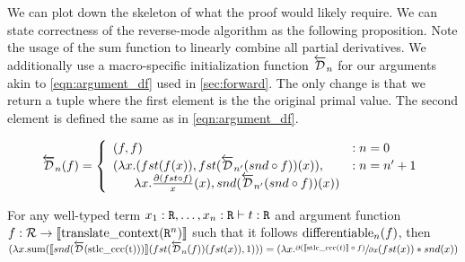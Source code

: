   We can plot down the skeleton of what the proof would likely require.
  We can state correctness of the reverse-mode algorithm as the following proposition.
  Note the usage of the $\text{sum}$ function to linearly combine all partial derivatives.
  We additionally use a macro-specific initialization function $\overleftarrow{\mathcal{D}}_n$ for our arguments akin to \cref{eqn:argument_df} used in \cref{sec:forward}.
  The only change is that we return a tuple where the first element is the the original primal value.
  The second element is defined the same as in \cref{eqn:argument_df}.

  \begin{equation*}
    \overleftarrow{\mathcal{D}}_n(f) =
      \left\{
        \begin{array}{ll}
          (f, f) & : n = 0 \\
          (\lambda x. (fst(f(x)), fst(\overleftarrow{\mathcal{D}}_{n'}(snd \circ f))(x)), & : n = n' + 1 \\
          \;\;\;\;\;\; \lambda x. \frac{\partial{(fst \circ f)}}{x}(x), snd(\overleftarrow{\mathcal{D}}_{n'}(snd\circ f))(x))
        \end{array}
      \right.
  \label{eqn:argument_df_rev}
  \end{equation*}

  \begin{proposition}
    For any well-typed term $x_1 : \texttt{R}, \dots, x_n : \texttt{R} \vdash t : \texttt{R}$ and argument function $f :  \mathcal{R} \rightarrow \llbracket \text{translate\_context}(\texttt{R}^n) \rrbracket$ such that it follows $\text{differentiable}_{n}(f)$, then $(\lambda x. \text{sum}(\llbracket snd(\overleftarrow{\mathcal{D}}(\text{stlc\_ccc(t)}))\rrbracket (fst(\overleftarrow{\mathcal{D}}_n(f)) (fst(x)), 1))) = (\lambda x. \sfrac{\partial{(\llbracket\text{stlc\_ccc}(t)\rrbracket \circ f)}}{\partial{x}}(fst(x)) * snd(x))$
  \end{proposition}

  \begin{proposition}
  \end{proposition}
  \begin{proposition}
  \end{proposition}
  \begin{definition}
  \end{definition}